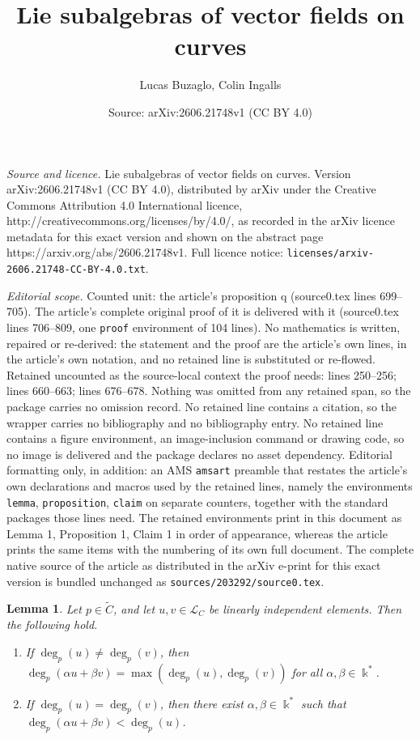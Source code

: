 \documentclass[10pt,a4paper]{amsart}
\title{Lie subalgebras of vector fields on curves}
\author{Lucas Buzaglo, Colin Ingalls}
\date{Source: arXiv:2606.21748v1 (CC BY 4.0)}
\newtheorem{lemma}{Lemma}
\def\L{\mathcal{L}}
\def\kk{\Bbbk}
\begin{document}
\maketitle

\noindent\emph{Source and licence.} Lie subalgebras of vector fields on curves. Version arXiv:2606.21748v1 (CC BY 4.0), distributed by arXiv under the Creative Commons Attribution 4.0 International licence, http://creativecommons.org/licenses/by/4.0/, as recorded in the arXiv licence metadata for this exact version and shown on the abstract page https://arxiv.org/abs/2606.21748v1. Full licence notice: \texttt{licenses/arxiv-2606.21748-CC-BY-4.0.txt}.\par\smallskip

\noindent\textit{Editorial scope.} Counted unit: the article's proposition q (source0.tex lines 699--705). The article's complete original proof of it is delivered with it (source0.tex lines 706--809, one \texttt{proof} environment of 104 lines). No mathematics is written, repaired or re-derived: the statement and the proof are the article's own lines, in the article's own notation, and no retained line is substituted or re-flowed.  Retained uncounted as the source-local context the proof needs: lines 250--256; lines 660--663; lines 676--678.  Nothing was omitted from any retained span, so the package carries no omission record.  No retained line contains a citation, so the wrapper carries no bibliography and no bibliography entry.  No retained line contains a figure environment, an image-inclusion command or drawing code, so no image is delivered and the package declares no asset dependency.  Editorial formatting only, in addition: an AMS \texttt{amsart} preamble that restates the article's own declarations and macros used by the retained lines, namely the environments \texttt{lemma}, \texttt{proposition}, \texttt{claim} on separate counters, together with the standard packages those lines need.  The retained environments print in this document as Lemma 1, Proposition 1, Claim 1 in order of appearance, whereas the article prints the same items with the numbering of its own full document.  The complete native source of the article as distributed in the arXiv e-print for this exact version is bundled unchanged as \texttt{sources/203292/source0.tex}.
\begin{lemma}\label{lem:properties of deg(g)}
    Let $p \in \widetilde{C}$, and let $u,v \in \L_C$ be linearly independent elements. Then the following hold.
    \begin{enumerate}
        \item If $\deg_p(u) \neq \deg_p(v)$, then $\deg_p(\alpha u + \beta v) = \max(\deg_p(u),\deg_p(v))$ for all $\alpha, \beta \in \kk^*$.\label{item:maximum condition}
        \item If $\deg_p(u) = \deg_p(v)$, then there exist $\alpha,\beta \in \kk^*$ such that $\deg_p(\alpha u + \beta v) < \deg_p(u)$.\label{item:decrease equal degree}
    \end{enumerate}
\end{lemma}
\end{document}
